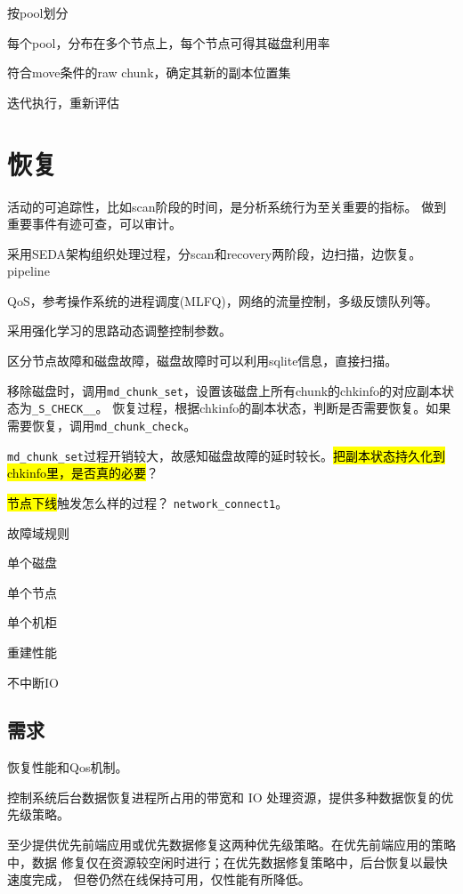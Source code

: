 \begin{enumbox}
\item 按pool划分
\item 每个pool，分布在多个节点上，每个节点可得其磁盘利用率
\item 符合move条件的raw chunk，确定其新的副本位置集
\item 迭代执行，重新评估
\end{enumbox}

\section{恢复}
活动的可追踪性，比如scan阶段的时间，是分析系统行为至关重要的指标。
做到重要事件有迹可查，可以审计。

采用SEDA架构组织处理过程，分scan和recovery两阶段，边扫描，边恢复。
pipeline

QoS，参考操作系统的进程调度(MLFQ)，网络的流量控制，多级反馈队列等。

采用强化学习的思路动态调整控制参数。

区分节点故障和磁盘故障，磁盘故障时可以利用sqlite信息，直接扫描。

移除磁盘时，调用\verb|md_chunk_set|，设置该磁盘上所有chunk的chkinfo的对应副本状态为\verb|_S_CHECK__|。
恢复过程，根据chkinfo的副本状态，判断是否需要恢复。如果需要恢复，调用\verb|md_chunk_check|。

\verb|md_chunk_set|过程开销较大，故感知磁盘故障的延时较长。\hl{把副本状态持久化到chkinfo里，是否真的必要}？

\hl{节点下线}触发怎么样的过程？ \verb|network_connect1|。

故障域规则

单个磁盘

单个节点

单个机柜

重建性能

不中断IO

\subsection{需求}

恢复性能和Qos机制。

控制系统后台数据恢复进程所占用的带宽和 IO 处理资源，提供多种数据恢复的优先级策略。

至少提供优先前端应用或优先数据修复这两种优先级策略。在优先前端应用的策略中，数据
修复仅在资源较空闲时进行；在优先数据修复策略中，后台恢复以最快速度完成，
但卷仍然在线保持可用，仅性能有所降低。

